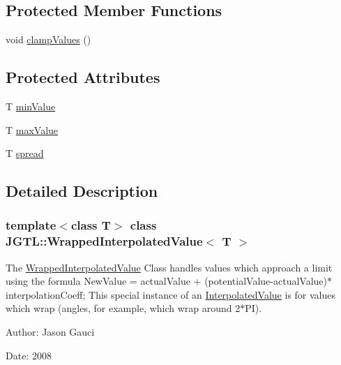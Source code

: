 \subsection*{Protected Member Functions}
\begin{CompactItemize}
\item 
void \hyperlink{class_j_g_t_l_1_1_wrapped_interpolated_value_eb23a3589cb6fb75cdcea67e12286ea4}{clamp\-Values} ()
\end{CompactItemize}
\subsection*{Protected Attributes}
\begin{CompactItemize}
\item 
T \hyperlink{class_j_g_t_l_1_1_wrapped_interpolated_value_7d460dd7979c409f93fc0c2d65c58a93}{min\-Value}
\item 
T \hyperlink{class_j_g_t_l_1_1_wrapped_interpolated_value_9781648d382fb2c4cbb90a6385189992}{max\-Value}
\item 
T \hyperlink{class_j_g_t_l_1_1_wrapped_interpolated_value_6b4723237650b21c40b191477207c953}{spread}
\end{CompactItemize}


\subsection{Detailed Description}
\subsubsection*{template$<$class T$>$ class JGTL::Wrapped\-Interpolated\-Value$<$ T $>$}

The \hyperlink{class_j_g_t_l_1_1_wrapped_interpolated_value}{Wrapped\-Interpolated\-Value} Class handles values which approach a limit using the formula New\-Value = actual\-Value + (potential\-Value-actual\-Value)$\ast$interpolation\-Coeff; This special instance of an \hyperlink{class_j_g_t_l_1_1_interpolated_value}{Interpolated\-Value} is for values which wrap (angles, for example, which wrap around 2$\ast$PI). 

\begin{Desc}
\item[Author:]Jason Gauci \end{Desc}
\begin{Desc}
\item[Date:]2008 \end{Desc}




